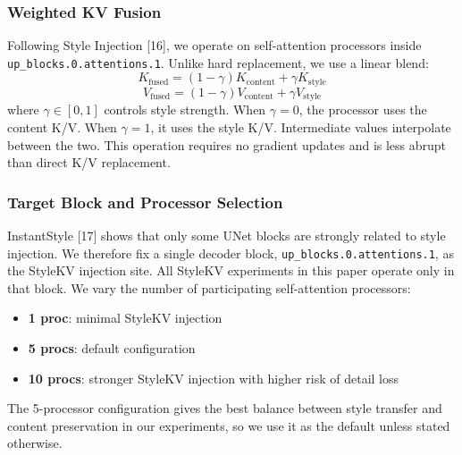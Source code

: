 \documentclass[10pt,twocolumn]{article}
\begin{document}
\subsubsection{Weighted KV Fusion}

Following Style Injection [16], we operate on self-attention processors inside \texttt{up\_blocks.0.attentions.1}. Unlike hard replacement, we use a linear blend:
\begin{equation}
K_{\text{fused}} = (1 - \gamma) K_{\text{content}} + \gamma K_{\text{style}} \label{eq:kfusion}
\end{equation}
\begin{equation}
V_{\text{fused}} = (1 - \gamma) V_{\text{content}} + \gamma V_{\text{style}} \label{eq:vfusion}
\end{equation}
where $\gamma \in [0, 1]$ controls style strength. When $\gamma=0$, the processor uses the content K/V. When $\gamma=1$, it uses the style K/V. Intermediate values interpolate between the two. This operation requires no gradient updates and is less abrupt than direct K/V replacement.

\subsubsection{Target Block and Processor Selection}

InstantStyle [17] shows that only some UNet blocks are strongly related to style injection. We therefore fix a single decoder block, \texttt{up\_blocks.0.attentions.1}, as the StyleKV injection site. All StyleKV experiments in this paper operate only in that block. We vary the number of participating self-attention processors:

\begin{itemize}
  \setlength{\itemsep}{0pt}
\item {\bfseries 1 proc}: minimal StyleKV injection
\item {\bfseries 5 procs}: default configuration
\item {\bfseries 10 procs}: stronger StyleKV injection with higher risk of detail loss
\end{itemize}

The 5-processor configuration gives the best balance between style transfer and content preservation in our experiments, so we use it as the default unless stated otherwise.
\end{document}
